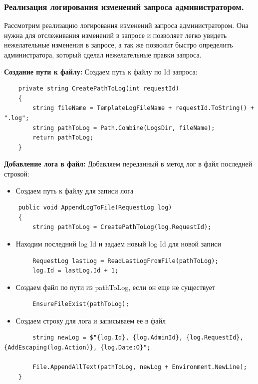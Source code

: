 \subsubsection{Реализация логирования изменений запроса администратором.}

Рассмотрим реализацию логирования изменений запроса администратором. Она нужна для отслеживания изменений в запросе и позволяет легко увидеть нежелательные изменения в запросе, а так же позволит быстро определить администратора, который сделал нежелательные правки запроса.

\textbf{Создание пути к файлу:} Создаем путь к файлу по Id запроса:
\begin{verbatim}
    private string CreatePathToLog(int requestId)
    {
        string fileName = TemplateLogFileName + requestId.ToString() + ".log";
        string pathToLog = Path.Combine(LogsDir, fileName);
        return pathToLog;
    }
\end{verbatim}

\textbf{Добавление лога в файл:} Добавляем переданный в метод лог в файл последней строкой:
\begin{itemize}
	\item{Создаем путь к файлу для записи лога}
\end{itemize}
\begin{verbatim}
    public void AppendLogToFile(RequestLog log)
    {
        string pathToLog = CreatePathToLog(log.RequestId);
\end{verbatim}
\begin{itemize}
	\item{Находим последний log Id и задаем новый log Id для новой записи}
\end{itemize}
\begin{verbatim}
        RequestLog lastLog = ReadLastLogFromFile(pathToLog);
        log.Id = lastLog.Id + 1;
\end{verbatim}

\begin{itemize}
	\item{Создаем файл по пути из pathToLog, если он еще не существует}
\end{itemize}
\begin{verbatim}
        EnsureFileExist(pathToLog);
\end{verbatim}

\begin{itemize}
	\item{Создаем строку для лога и записываем ее в файл}
\end{itemize}
\begin{verbatim}
        string newLog = $"{log.Id}, {log.AdminId}, {log.RequestId}, {AddEscaping(log.Action)}, {log.Date:O}";

        File.AppendAllText(pathToLog, newLog + Environment.NewLine);
    }
\end{verbatim}

